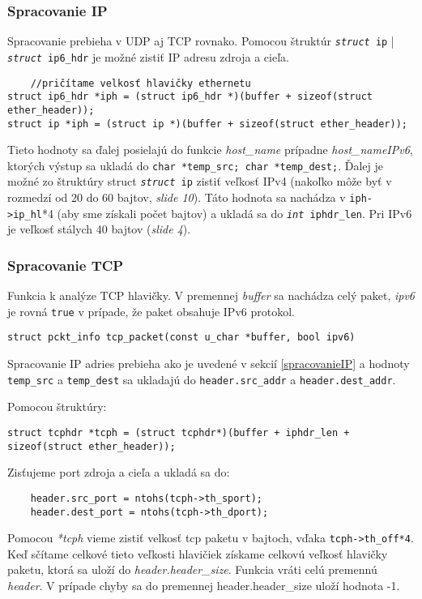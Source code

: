 \documentclass[11pt, a4paper]{article}
\begin{document}
	\subsubsection{Spracovanie IP}
	\label{spracovanie IP}
	Spracovanie prebieha v UDP aj TCP rovnako.
	Pomocou štruktúr \texttt{\emph{struct} ip} | \texttt{\emph{struct} ip6\_hdr} je možné zistiť IP adresu zdroja a cieľa. 
	\begin{lstlisting}
	//pričítame velkosť hlavičky ethernetu
struct ip6_hdr *iph = (struct ip6_hdr *)(buffer + sizeof(struct ether_header));
struct ip *iph = (struct ip *)(buffer + sizeof(struct ether_header));	
	\end{lstlisting}
	
Tieto hodnoty sa ďalej posielajú do funkcie \emph{host\_name} prípadne \emph{host\_nameIPv6}, ktorých výstup sa ukladá do \texttt{char *temp\_src;
    char *temp\_dest;}. Ďalej je možné zo štruktúry struct \texttt{\emph{struct} ip} zistiť veľkosť IPv4 (nakoľko môže byť v rozmedzí od 20 do 60 bajtov, \emph{slide 10}\cite{prednaskaIPv4}). Táto hodnota sa nachádza v \texttt{iph->ip\_hl}*4 (aby sme získali počet bajtov) a ukladá sa do \texttt{\emph{int} iphdr\_len}. Pri IPv6 je veľkosť stálych 40 bajtov (\emph{slide 4}\cite{prednaskaIPv6}).
    
	\subsubsection{Spracovanie TCP}
	Funkcia k analýze TCP hlavičky. V premennej \emph{buffer} sa nachádza celý paket, \emph{ipv6} je rovná \texttt{true} v prípade, že paket obsahuje IPv6 protokol. 
	\begin{lstlisting}
struct pckt_info tcp_packet(const u_char *buffer, bool ipv6)
	\end{lstlisting}
	\label{spracovanieTCP}
	Spracovanie IP adries prebieha ako je uvedené v sekcií \ref{spracovanieIP} a hodnoty \texttt{temp\_src} a \texttt{temp\_dest} sa ukladajú do \texttt{header.src\_addr} a \texttt{header.dest\_addr}. 
	
	Pomocou štruktúry: 
	\begin{lstlisting}
struct tcphdr *tcph = (struct tcphdr*)(buffer + iphdr_len + sizeof(struct ether_header));
	\end{lstlisting}
Zisťujeme port zdroja a cieľa a ukladá sa do:
	\begin{lstlisting}
	header.src_port = ntohs(tcph->th_sport);
	header.dest_port = ntohs(tcph->th_dport);
	\end{lstlisting}
Pomocou \emph{*tcph} vieme zistiť velkosť tcp paketu v bajtoch, vďaka \texttt{tcph->th\_off*4}.
Keď sčítame celkové tieto veľkosti hlavičiek získame celkovú veľkosť hlavičky paketu, ktorá sa uloží do \emph{header.header\_size}. Funkcia vráti celú premennú \emph{header}. V prípade chyby sa do premennej header.header\_size uloží hodnota -1.
\end{document}
